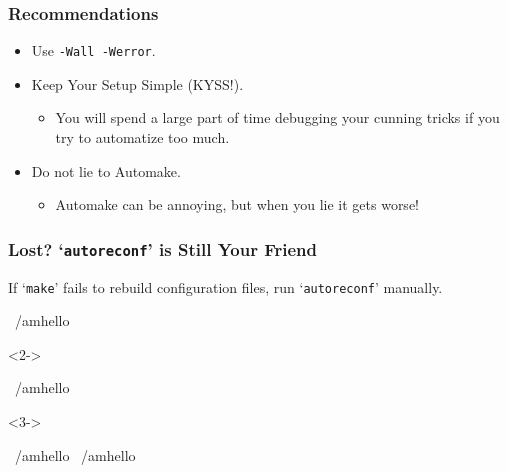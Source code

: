 \documentclass{beamer}
\newcommand{\command}[1]{`\texttt{#1}'}
\begin{document}
\begin{frame}
\frametitle{Recommendations}

\begin{itemize}
\item<1-> Use \texttt{-Wall -Werror}.
\item<2-> Keep Your Setup Simple (KYSS!).
\begin{itemize}
\item You will spend a large part of time debugging your cunning
  tricks if you try to automatize too much.
\end{itemize}
\item<3-> Do not lie to Automake.
\begin{itemize}
\item Automake can be annoying, but when you lie it gets worse!
\end{itemize}
\end{itemize}

\end{frame}


\begin{frame}[fragile]
\frametitle{Lost?  \command{autoreconf} is Still Your Friend}

If \command{make} fails to rebuild configuration files, run
\command{autoreconf} manually.

\begin{block}{}
\begin{semiverbatim}
~/amhello %
\end{semiverbatim}
\end{block}

\bigskip


\begin{block}<2->{}
\begin{semiverbatim}
~/amhello %
\end{semiverbatim}
\end{block}

\bigskip


\begin{block}<3->{}
\begin{semiverbatim}
~/amhello %
~/amhello %
\end{semiverbatim}
\end{block}


\end{frame}
\end{document}
